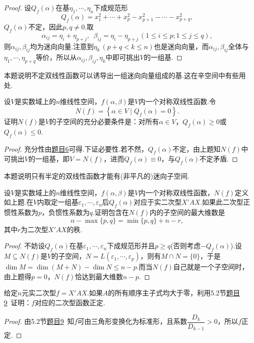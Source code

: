 \begin{proof}
	设$Q_f(\alpha)$在基$\eta_1,\cdots,\eta_n$下成规范形
	\[
		Q_f(\alpha)=x_1^2+\cdots+x_p^2-x_{p+1}^2-\cdots-x_{p+q}^2,
	\]
	$Q_f(\alpha)$不定，因此$p,q\ne 0$.取
	\[
		\alpha_{ij}=\eta_i+\eta_{p+j},\enspace \beta_{ij}=\eta_i-\eta_{p+j}\,(1\le i\le p;1\le j\le q),
	\]
	则$\alpha_{ij},\beta_{ij}$均为迷向向量.注意到$\eta_k\,(p+q<k\le n)$也是迷向向量，而$\alpha_{ij},\beta_{ij}$全体与$\eta_1,\cdots,\eta_{p+q}$等价，所以从$\alpha_{ij},\beta_{ij},\eta_k$中即可挑出$V$的一组基.
\end{proof}
\begin{note}
	本题说明不定双线性函数可以诱导出一组迷向向量组成的基.这在辛空间中有些用处.
\end{note}
\begin{prob}[8]
	设$V$是实数域上的$n$维线性空间，$f(\alpha,\beta)$是$V$内一个对称双线性函数.令
	\[
		N(f)=\left\{\alpha\in V\mid Q_f(\alpha)=0\right\}.
	\]
	证明$N(f)$是$V$的子空间的充分必要条件是：对所有$\alpha\in V$，$Q_f(\alpha)\ge 0$或$Q_f(\alpha)\le 0$.
\end{prob}
\begin{proof}
	充分性由\hyperlink{KernelOfBilinearFunction}{题目6}可得.下证必要性.若不然，$Q_f(\alpha)$不定，由上题知$N(f)$中可挑出$V$的一组基，即$V=N(f)$，进而$Q_f(\alpha)\equiv 0$，与$Q_f(\alpha)$不定矛盾.
\end{proof}
\begin{note}
	本题说明只有半定的双线性函数才能有(非平凡的)迷向子空间.
\end{note}
\begin{prob}[9]
	设$V$是实数域上的$n$维线性空间，$f(\alpha,\beta)$是$V$内一个对称双线性函数，$N(f)$定义如上题.在$V$内取定一组基$\varepsilon_1,\cdots,\varepsilon_n$后$Q_f(\alpha)$对应于实二次型$X'AX$.如果此二次型正惯性系数为$p$，负惯性系数为$q$.证明包含在$N(f)$内的子空间的最大维数是
	\[
		n-\max\{p,q\}=\min\{p,q\}+n-r,
	\]
	其中$r$为二次型$X'AX$的秩.
\end{prob}
\begin{proof}
	不妨设$Q_f(\alpha)$在基$\varepsilon_1,\cdots,\varepsilon_n$下成规范形并且$p\ge q$(否则考虑$-Q_f(\alpha)$).设$M\subseteq N(f)$是$V$的子空间，$N=L(\varepsilon_1,\cdots,\varepsilon_p)$，则有$M\cap N=\{0\}$，于是$\dim M=\dim(M+N)-\dim N\le n-p$.而当$N(f)$自己就是一个子空间时，由上题得$p=0$，$N(f)$恰达到最大维数$n-p$.
\end{proof}
\begin{prob}[10]
	给定$n$元实二次型$f=X'AX$.如果$A$的所有顺序主子式均大于零，利用5.2节\hyperlink{TriangleTransformation}{题目9}~证明：$f$对应的二次型函数正定.
\end{prob}
\begin{proof}
	由5.2节\hyperlink{TriangleTransformation}{题目9}~知$f$可由三角形变换化为标准形，且系数$\dfrac{D_k}{D_{k-1}}>0$，所以$f$正定.
\end{proof}
